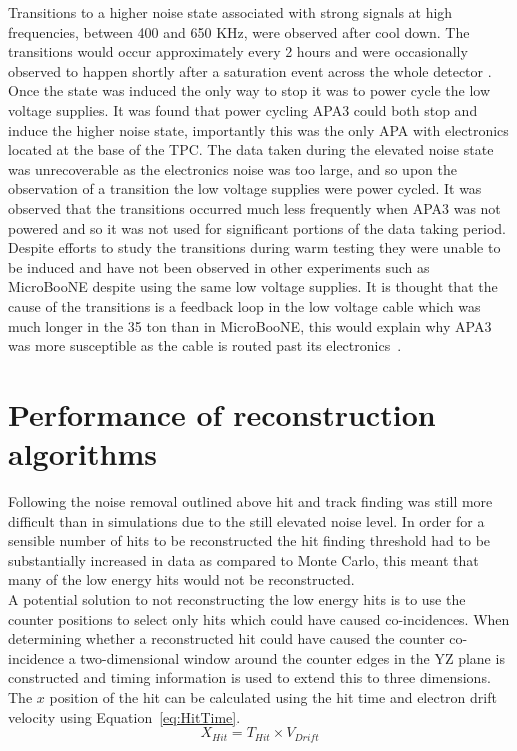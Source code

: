 Transitions to a higher noise state associated with strong signals at high frequencies, between 400 and 650 KHz, were observed after cool down. The transitions would occur approximately every 2 hours and were occasionally observed to happen shortly after a saturation event across the whole detector \citep{35tonNoiseMeeting}. Once the state was induced the only way to stop it was to power cycle the low voltage supplies. It was found that power cycling APA3 could both stop and induce the higher noise state, importantly this was the only APA with electronics located at the base of the TPC. The data taken during the elevated noise state was unrecoverable as the electronics noise was too large, and so upon the observation of a transition the low voltage supplies were power cycled. It was observed that the transitions occurred much less frequently when APA3 was not powered and so it was not used for significant portions of the data taking period. Despite efforts to study the transitions during warm testing they were unable to be induced and have not been observed in other experiments such as MicroBooNE despite using the same low voltage supplies. It is thought that the cause of the transitions is a feedback loop in the low voltage cable which was much longer in the 35 ton than in MicroBooNE, this would explain why APA3 was more susceptible as the cable is routed past its electronics~\citep{35tonNoiseDoc}.

\section{Performance of reconstruction algorithms} \label{sec:DataAlgs}  %
Following the noise removal outlined above hit and track finding was still more difficult than in simulations due to the still elevated noise level. In order for a sensible number of hits to be reconstructed the hit finding threshold had to be substantially increased in data as compared to Monte Carlo, this meant that many of the low energy hits would not be reconstructed. \\

A potential solution to not reconstructing the low energy hits is to use the counter positions to select only hits which could have caused co-incidences. When determining whether a reconstructed hit could have caused the counter co-incidence a two-dimensional window around the counter edges in the YZ plane is constructed and timing information is used to extend this to three dimensions.  The $x$ position of the hit can be calculated using the hit time and electron drift velocity using Equation~\ref{eq:HitTime}.
\begin{equation} \label{eq:HitTime}
  X_{Hit} = T_{Hit} \times V_{Drift}
\end{equation}

